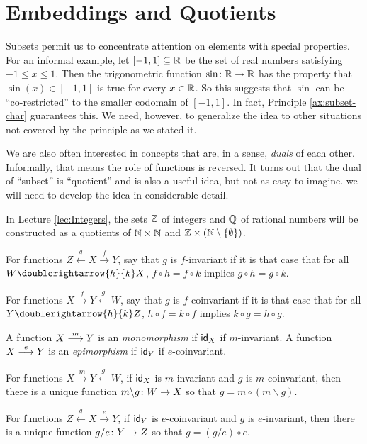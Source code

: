 \section{Embeddings and Quotients}

Subsets permit us to concentrate attention on elements with special properties.
For an informal example, let $[-1,1]\subseteq\RR$ be the set of real numbers satisfying $-1\leq x\leq 1$.
Then the trigonometric function $\fromto \sin\RR\RR$ has the property that $\sin(x)\in [-1,1]$ is true for every $x\in\RR$.
So this suggests that $\sin$ can be ``co-restricted'' to the smaller codomain of $[-1,1]$. In fact, Principle \ref{ax:subset-char} guarantees this.
We need, however, to generalize the idea to other situations not covered by the principle as we stated it.

We are also often interested in concepts that are, in a sense, \emph{duals} of each other. 
Informally, that means the role of functions is reversed.
It turns out that the dual of ``subset'' is ``quotient'' and is also a useful idea, but not as easy to imagine. we will need to develop the idea in considerable detail.

In Lecture \ref{lec:Integers}, the sets $\ZZ$ of integers and $\QQ$ of rational numbers will be constructed as a quotients of $\NN\times \NN$ and $\ZZ\times (\NN\setminus\{\emptyset\})$.

\begin{defn}
	For functions $Z\stackrel{g}{\longleftarrow}X\stackrel{f}{\longrightarrow}Y$, say that $g$ is {$f$-invariant} if it is that case that for all $W\doublerightarrow{h}{k}X$, $f\circ h=f\circ k$ implies $g\circ h = g\circ k$.
	
	For functions $X\stackrel{f}{\longrightarrow}Y\stackrel{g}{\longleftarrow}W$, say that $g$ is {$f$-coinvariant} if it is that case that for all $Y\doublerightarrow{h}{k}Z$, $h\circ f=k\circ f$ implies $k\circ g = h\circ g$.
	
	A function $\sfromto mXY$ is an \emph{monomorphism} if $\id_X$ if $m$-invariant. 	
	A function $\sfromto eXY$ is an \emph{epimorphism} if $\id_Y$ if $e$-coinvariant. 
\end{defn}

\begin{principle}
	For functions $X\stackrel{m}{\longrightarrow}Y\stackrel{g}{\longleftarrow}W$, if $\id_X$ is $m$-invariant and $g$ is $m$-coinvariant, then there is a unique function $\fromto {m\backslash g}WX$ so that $g=m\circ (m\backslash g)$.
	
	For functions $Z\stackrel{g}{\longleftarrow}X\stackrel{e}{\longrightarrow}Y$, if $\id_Y$ is $e$-coinvariant and $g$ is $e$-invariant, then there is a unique function $\fromto {g/e}YZ$ so that $g=(g/e)\circ e$.
\end{principle}


